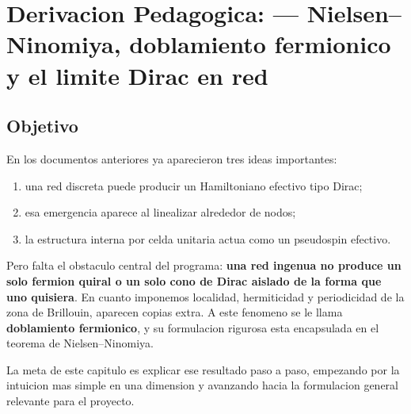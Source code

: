 \chapter{Derivacion Pedagogica: --- Nielsen--Ninomiya, doblamiento fermionico y el limite Dirac en red}
\label{ch:nielsen-ninomiya-doblamento}







\section{Objetivo}

En los documentos anteriores ya aparecieron tres ideas importantes:

\begin{enumerate}[leftmargin=*]
  \item una red discreta puede producir un Hamiltoniano efectivo tipo Dirac;
  \item esa emergencia aparece al linealizar alrededor de nodos;
  \item la estructura interna por celda unitaria actua como un pseudospin efectivo.
\end{enumerate}

Pero falta el obstaculo central del programa: \textbf{una red ingenua no produce un solo fermion quiral o un solo cono de Dirac aislado de la forma que uno quisiera}. En cuanto imponemos localidad, hermiticidad y periodicidad de la zona de Brillouin, aparecen copias extra. A este fenomeno se le llama \textbf{doblamiento fermionico}, y su formulacion rigurosa esta encapsulada en el teorema de Nielsen--Ninomiya.

La meta de este capitulo es explicar ese resultado paso a paso, empezando por la intuicion mas simple en una dimension y avanzando hacia la formulacion general relevante para el proyecto.

